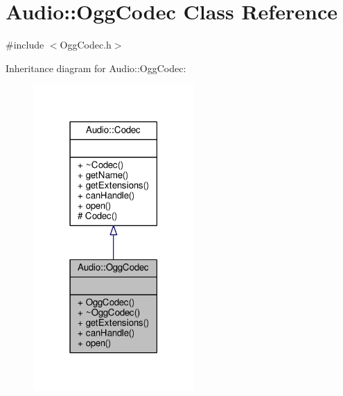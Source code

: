 \hypertarget{classAudio_1_1OggCodec}{}\section{Audio\+:\+:Ogg\+Codec Class Reference}
\label{classAudio_1_1OggCodec}


{\ttfamily \#include $<$Ogg\+Codec.\+h$>$}



Inheritance diagram for Audio\+:\+:Ogg\+Codec\+:
\nopagebreak
\begin{figure}[H]
\begin{center}
\leavevmode
\includegraphics[width=174pt]{d2/d3c/classAudio_1_1OggCodec__inherit__graph}
\end{center}
\end{figure}


